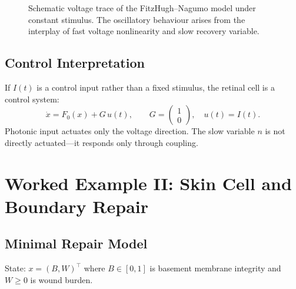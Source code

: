 \documentclass[12pt,openany]{book}
\begin{document}
\begin{figure}[H]
\centering
{}
\caption{Schematic voltage trace of the FitzHugh--Nagumo model under constant
stimulus. The oscillatory behaviour arises from the interplay of fast
voltage nonlinearity and slow recovery variable.}
\label{fig:fhn-trace}
\end{figure}

\section{Control Interpretation}

If $I(t)$ is a control input rather than a fixed stimulus, the retinal cell is
a control system:
\[
  \dot x = F_0(x) + G\,u(t), \qquad
  G = \begin{pmatrix}1\\0\end{pmatrix}, \quad u(t)=I(t).
\]
Photonic input actuates only the voltage direction. The slow variable $n$ is
not directly actuated—it responds only through coupling.

\chapter{Worked Example II: Skin Cell and Boundary Repair}
\label{ch:wk2}

\section{Minimal Repair Model}

State: $x=(B,W)^\top$ where $B\in[0,1]$ is basement membrane integrity and $W\ge 0$
is wound burden.
\end{document}
